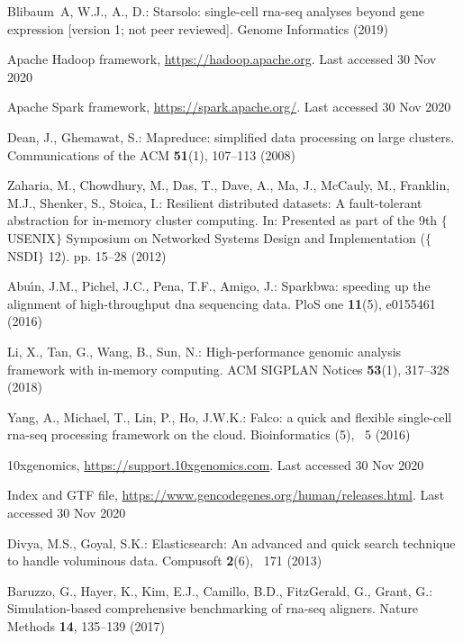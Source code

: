 \documentclass[runningheads]{llncs}
\begin{document}
\begin{thebibliography}{8}
Blibaum~A, W.J., A., D.: Starsolo: single-cell rna-seq analyses beyond gene
expression [version 1; not peer reviewed]. Genome Informatics  (2019)

Apache Hadoop framework, \url{https://hadoop.apache.org}. Last accessed 30
Nov 2020

Apache Spark framework, \url{https://spark.apache.org/}. Last accessed 30
Nov 2020

Dean, J., Ghemawat, S.: Mapreduce: simplified data processing on large
clusters. Communications of the ACM  \textbf{51}(1),  107--113 (2008)

Zaharia, M., Chowdhury, M., Das, T., Dave, A., Ma, J., McCauly, M., Franklin,
M.J., Shenker, S., Stoica, I.: Resilient distributed datasets: A
fault-tolerant abstraction for in-memory cluster computing. In: Presented as
part of the 9th $\{$USENIX$\}$ Symposium on Networked Systems Design and
Implementation ($\{$NSDI$\}$ 12). pp. 15--28 (2012)

Abu{\'\i}n, J.M., Pichel, J.C., Pena, T.F., Amigo, J.: Sparkbwa: speeding up
the alignment of high-throughput dna sequencing data. PloS one
\textbf{11}(5),  e0155461 (2016)

Li, X., Tan, G., Wang, B., Sun, N.: High-performance genomic analysis framework
with in-memory computing. ACM SIGPLAN Notices  \textbf{53}(1),  317--328
(2018)

Yang, A., Michael, T., Lin, P., Ho, J.W.K.: Falco: a quick and flexible
single-cell rna-seq processing framework on the cloud. Bioinformatics (5), ~5
(2016)

10xgenomics, \url{https://support.10xgenomics.com}. Last accessed 30
Nov 2020

Index and GTF file, \url{https://www.gencodegenes.org/human/releases.html}. Last accessed 30
Nov 2020

Divya, M.S., Goyal, S.K.: Elasticsearch: An advanced and quick search technique
to handle voluminous data. Compusoft  \textbf{2}(6), ~171 (2013)

Baruzzo, G., Hayer, K., Kim, E.J., Camillo, B.D., FitzGerald, G., Grant, G.:
  Simulation-based comprehensive benchmarking of rna-seq aligners. Nature
  Methods  \textbf{14},  135--139 (2017)


\end{thebibliography}
\end{document}
